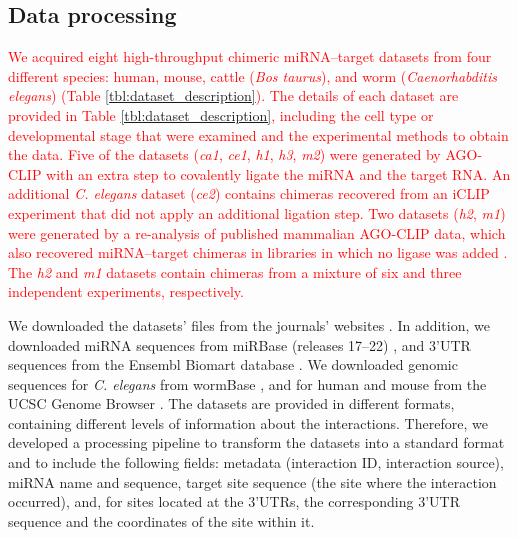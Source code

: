\documentclass{bmcart}
\begin{document}
\subsection*{Data processing} \label{methods_dataprocessing}
\textcolor{red}{We acquired eight high-throughput chimeric miRNA--target datasets from four different species: human, mouse, cattle (\textit{Bos taurus}), and worm (\textit{Caenorhabditis elegans}) (Table \ref{tbl:dataset_description}). 
The details of each dataset are provided in Table \ref{tbl:dataset_description}, including the cell type or developmental stage that were examined and the experimental methods to obtain the data. Five of the datasets (\textit{ca1}, \textit{ce1}, \textit{h1},  \textit{h3}, \textit{m2}) were generated by AGO-CLIP with an extra step to covalently ligate the miRNA and the target RNA.
An additional \textit{C. elegans} dataset (\textit{ce2}) contains chimeras recovered from an iCLIP experiment that did not apply an additional ligation step. Two datasets (\textit{h2}, \textit{m1}) were generated by a re-analysis of published mammalian AGO-CLIP data, which also recovered miRNA--target chimeras in libraries in which no ligase was added \cite{grosswendt2014unambiguous}. The \textit{h2} and \textit{m1} datasets contain chimeras from a mixture of six and three independent experiments, respectively.
}

We downloaded the datasets' files from the journals' websites \cite{scheel2017global, grosswendt2014unambiguous, broughton2016pairing, helwak2013mapping, darnell_moore2015mirna}. In addition, we downloaded miRNA sequences from miRBase (releases 17--22) \cite{kozomara2013mirbase}, and 3'UTR sequences from the Ensembl Biomart database \cite{smedley2015biomart}. We downloaded genomic sequences for \textit{C. elegans} from wormBase \cite{lee2017wormbase}, and for human and mouse from the UCSC Genome Browser \cite{karolchik2004ucsc}.
The datasets are provided in different formats, containing different levels of information about the interactions. Therefore, we developed a processing pipeline to transform the datasets into a standard format and to include the following fields: metadata (interaction ID, interaction source), miRNA name and sequence, target site sequence (the site where the interaction occurred), and, for sites located at the 3'UTRs, the corresponding 3'UTR sequence and the coordinates of the site within it.
\end{document}
